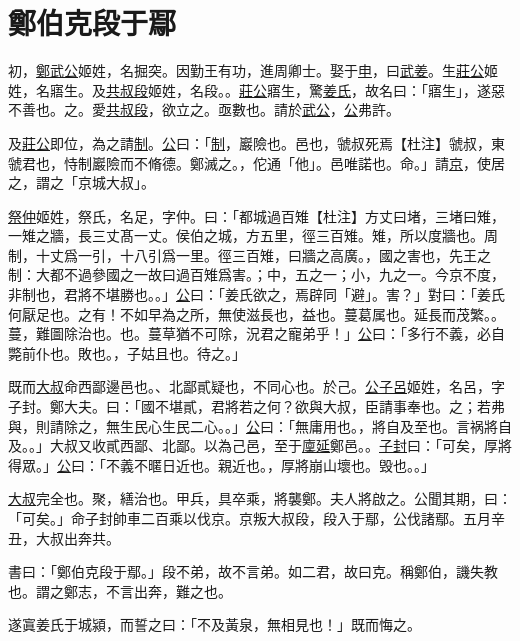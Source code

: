 \documentclass{article}
\date{}
\newcommand{\tsu}{\small\kaishu\color{brown}}
\newcommand{\ta}{\small\kaishu\color{applegreen}}
\begin{document}
\makecover
\tableofcontents

\section{鄭伯克段于鄢}

\noindent{\tsu 隱公元年}

初，\uline{鄭武公}{\tsu 姬姓，名掘突。因勤王有功，進周卿士。}娶于\uline{申}，曰\uline{武姜}。生\uline{莊公}{\tsu 姬姓，名寤生。}及\uline{共叔段}{\tsu 姬姓，名段。}。\uline{莊公}寤生，驚\uline{姜氏}，故名曰：「寤生」，遂惡{\tsu 不善也。}之。愛\uline{共叔段}，欲立之。亟{\tsu 數也。}請於\uline{武公}，\uline{公}弗許。

及\uline{莊公}即位，為之請\uline{制}。\uline{公}曰：「\uline{制}，巖{\tsu 險也。}邑也，虢叔死焉{\ta 【杜注】虢叔，東虢君也，恃制巖險而不脩德。鄭滅之。}，佗{\tsu 通「他」。}邑唯{\tsu 諾也。}命。」請\uline{京}，使居之，謂之「京城大叔」。

\uline{祭仲}{\tsu 姬姓，祭氏，名足，字仲。}曰：「都城過百雉{\ta【杜注】方丈曰堵，三堵曰雉，一雉之牆，長三丈髙一丈。侯伯之城，方五里，徑三百雉。}{\tsu 雉，所以度牆也。周制，十丈爲一引，十八引爲一里。徑三百雉，曰牆之高廣。}，國之害也，先王之制：大都不過參國之一{\tsu 故曰過百雉爲害。}；中，五之一；小，九之一。今京不度，非制也，君將不堪{\tsu 勝也。}。」\uline{公}曰：「姜氏欲之，焉辟{\tsu 同「避」。}害？」對曰：「姜氏何厭{\tsu 足也。}之有！不如早為之所，無使滋{\tsu 長也，益也。}蔓{\tsu 葛属也。延長而茂繁。}。蔓，難圖{\tsu 除治也。}也。蔓草猶不可除，況君之寵弟乎！」\uline{公}曰：「多行不義，必自斃{\tsu 前仆也。敗也。}，子姑{\tsu 且也。}待之。」

既而\uline{大叔}命西鄙{\tsu 邊邑也。}、北鄙貳{\tsu 疑也，不同心也。}於己。\uline{公子呂}{\tsu 姬姓，名呂，字子封。鄭大夫。}曰：「國不堪貳，君將若之何？欲與大叔，臣請事{\tsu 奉也。}之；若弗與，則請除之，無生民心{\tsu 生民二心。}。」\uline{公}曰：「無庸{\tsu 用也。}，將自及{\tsu 至也。言祸將自及。}。」大叔又收貳{\tsu 西鄙、北鄙。}以為己邑，至于\uline{廩延}{\tsu 鄭邑。}。\uline{子封}曰：「可矣，厚將得眾。」\uline{公}曰：「不義不暱{\tsu 日近也。親近也。}，厚將崩{\tsu 山壞也。毁也。}。」

\uline{大叔}完{\tsu 全也。}聚，繕{\tsu 治也。}甲兵，具卒乘，將襲鄭。夫人將啟之。公聞其期，曰：「可矣。」命子封帥車二百乘以伐京。京叛大叔段，段入于鄢，公伐諸鄢。五月辛丑，大叔出奔共。

書曰：「鄭伯克段于鄢。」段不弟，故不言弟。如二君，故曰克。稱鄭伯，譏失教也。謂之鄭志，不言出奔，難之也。

遂寘姜氏于城潁，而誓之曰：「不及黃泉，無相見也！」既而悔之。
\end{document}
